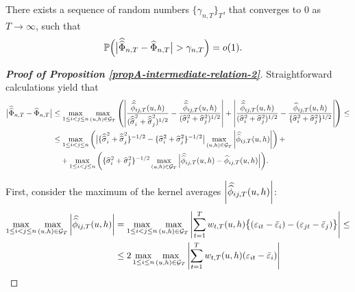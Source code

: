 \documentclass[a4paper,12pt]{article}
\newcommand{\doublehat}[1]{\skew{5.5}\widehat{\widehat{#1}}}
\newcommand{\doublehattwo}[1]{\widehat{\widehat{#1}}}
\begin{document}
\begin{propA}\label{propA-intermediate-relation-2}
There exists a sequence of random numbers $\{\gamma_{n, T}\}_T$, that converges to $0$ as $T\to \infty$, such that
\begin{align}\label{eq-intermediate-relation-2}
\pr \Big(\big|\doublehattwo{\Phi}_{n,T} &- \widehat{\Phi}_{n,T}\big| > \gamma_{n, T} \Big) = o(1).
\end{align}
\end{propA}
\begin{proof}[\textnormal{\textbf{Proof of Proposition \ref{propA-intermediate-relation-2}}}] 

Straightforward calculations yield that
\begin{align*}
\begin{split}
\big| \doublehattwo{\Phi}_{n, T} - \widehat{\Phi}_{n, T} \big| &\le \max_{1 \le i < j \le n} \max_{(u,h) \in \mathcal{G}_T} \left( \left|\frac{\doublehat{\phi}_{ij,T}(u,h)}{(\doublehattwo{\sigma}_i^2 + \doublehattwo{\sigma}_j^2)^{1/2}} - \frac{\doublehat{\phi}_{ij,T}(u,h)}{(\widehat{\sigma}_i^2 + \widehat{\sigma}_j^2)^{1/2}}\right| + \left|\frac{\doublehat{\phi}_{ij,T}(u,h)}{(\widehat{\sigma}_i^2 + \widehat{\sigma}_j^2)^{1/2}} - \frac{\widehat{\phi}_{ij,T}(u,h)} {\{ \widehat{\sigma}_i^2 + \widehat{\sigma}_j^2 \}^{1/2}} \right|\right)\le \\
&\le \max_{1 \le i < j \le n} \left( \big|\{\doublehattwo{\sigma}_i^2 + \doublehattwo{\sigma}_j^2 \}^{-1/2} - \{\widehat{\sigma}_i^2 + \widehat{\sigma}_j^2 \}^{-1/2}\big| \max_{(u,h) \in \mathcal{G}_T} \left|\doublehat{\phi}_{ij,T}(u,h)\right|\right) +\\
&\quad +\max_{1\le i < j \le n} \bigg( \{\widehat{\sigma}_i^2 + \widehat{\sigma}_j^2 \}^{-1/2}\max_{(u,h) \in \mathcal{G}_T} \Big| \doublehat{\phi}_{ij, T}(u,h) - \widehat{\phi}_{ij, T}(u,h) \Big|\bigg).
\end{split}
\end{align*}

First, consider the maximum of the kernel averages $\left|\doublehat{\phi}_{ij,T}(u,h)\right|$: 
\begin{align*}
\max_{1 \le i < j \le n} \max_{(u,h) \in \mathcal{G}_T}\left|\doublehat{\phi}_{ij,T}(u,h)\right| &= \max_{1 \le i <j\le n} \max_{(u,h) \in \mathcal{G}_T}\left| \sum_{t=1}^T w_{t,T}(u,h) \big\{ (\varepsilon_{it} - \bar{\varepsilon}_i) - (\varepsilon_{jt} - \bar{\varepsilon}_j)  \big\}\right| \le \\
& \le 2 \max_{1 \le i \le n} \max_{(u,h) \in \mathcal{G}_T}\left| \sum_{t=1}^T w_{t,T}(u,h) (\varepsilon_{it} - \bar{\varepsilon}_i) \right|
\end{align*}


\end{proof}
\end{document}
